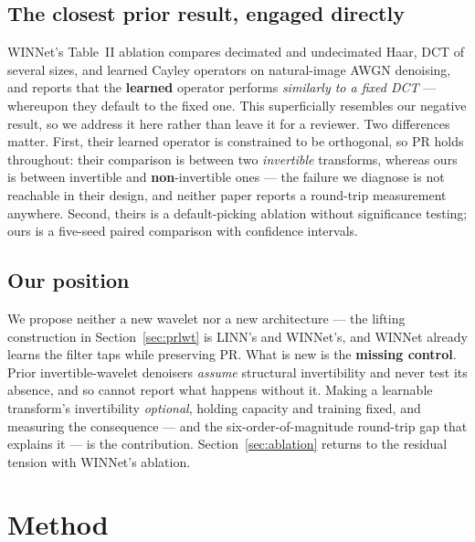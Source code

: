 \documentclass[conference]{IEEEtran}
\begin{document}
\subsection{The closest prior result, engaged directly}
WINNet's Table~II ablation compares decimated and undecimated Haar, DCT of
several sizes, and learned Cayley operators on natural-image AWGN denoising, and
reports that the \textbf{learned} operator performs \emph{similarly to a fixed
DCT} --- whereupon they default to the fixed one. This superficially resembles
our negative result, so we address it here rather than leave it for a reviewer.
Two differences matter. First, their learned operator is constrained to be
orthogonal, so PR holds throughout: their comparison is between two
\emph{invertible} transforms, whereas ours is between invertible and
\textbf{non}-invertible ones --- the failure we diagnose is not reachable in
their design, and neither paper reports a round-trip measurement anywhere.
Second, theirs is a default-picking ablation without significance testing; ours
is a five-seed paired comparison with confidence intervals.

\subsection{Our position}
We propose neither a new wavelet nor a new architecture --- the lifting
construction in Section~\ref{sec:prlwt} is LINN's and WINNet's, and WINNet
already learns the filter taps while preserving PR. What is new is the
\textbf{missing control}. Prior invertible-wavelet denoisers \emph{assume}
structural invertibility and never test its absence, and so cannot report what
happens without it. Making a learnable transform's invertibility
\emph{optional}, holding capacity and training fixed, and measuring the
consequence --- and the six-order-of-magnitude round-trip gap that explains it
--- is the contribution. Section~\ref{sec:ablation} returns to the residual
tension with WINNet's ablation.

\section{Method}
\end{document}

